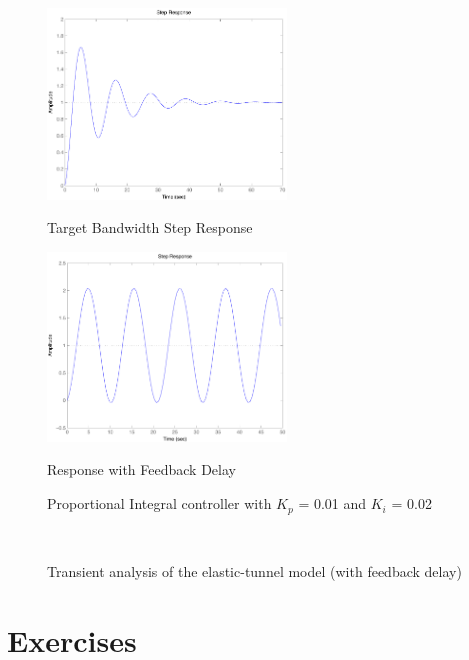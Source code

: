 \documentclass{article}
\begin{document}
\begin{figure}[htbp]
\begin{center} 
\begin{minipage}{0.4\textwidth} 
   \includegraphics[width=2.5in]{plots/trans/PI_step_B_001_002.pdf} 
\centerline{Target Bandwidth Step Response}
\end{minipage}
\hspace{1.2cm}
\begin{minipage}{0.4\textwidth} 
   \includegraphics[width=2.5in]{plots/trans/PI_step_B_001_002_delay_05.pdf}  
\centerline{Response with Feedback Delay}
\end{minipage}
\centerline{Proportional Integral controller with $K_p$ = 0.01 and
$K_i$ = 0.02}\\
\caption{Transient analysis of the elastic-tunnel model (with feedback delay)}
\label{fig:trans2} 
\end{center}
\end{figure}




\section{Exercises}
\label{sec:exercises}
\end{document}
